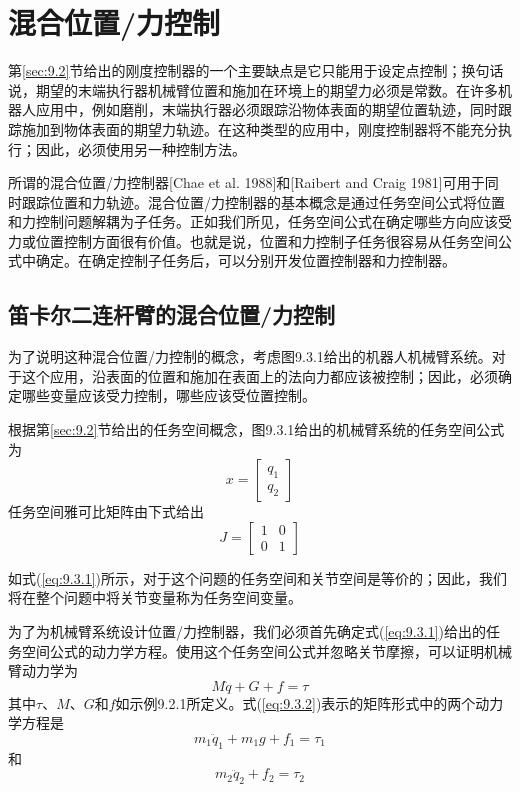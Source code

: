 \documentclass[12pt,a4paper]{ctexart}
\begin{document}
\section{混合位置/力控制}\label{sec:9.3}

第\ref{sec:9.2}节给出的刚度控制器的一个主要缺点是它只能用于设定点控制；换句话说，期望的末端执行器机械臂位置和施加在环境上的期望力必须是常数。在许多机器人应用中，例如磨削，末端执行器必须跟踪沿物体表面的期望位置轨迹，同时跟踪施加到物体表面的期望力轨迹。在这种类型的应用中，刚度控制器将不能充分执行；因此，必须使用另一种控制方法。

所谓的混合位置/力控制器[Chae et al. 1988]和[Raibert and Craig 1981]可用于同时跟踪位置和力轨迹。混合位置/力控制器的基本概念是通过任务空间公式将位置和力控制问题解耦为子任务。正如我们所见，任务空间公式在确定哪些方向应该受力或位置控制方面很有价值。也就是说，位置和力控制子任务很容易从任务空间公式中确定。在确定控制子任务后，可以分别开发位置控制器和力控制器。

\subsection{笛卡尔二连杆臂的混合位置/力控制}

为了说明这种混合位置/力控制的概念，考虑图9.3.1给出的机器人机械臂系统。对于这个应用，沿表面的位置和施加在表面上的法向力都应该被控制；因此，必须确定哪些变量应该受力控制，哪些应该受位置控制。

根据第\ref{sec:9.2}节给出的任务空间概念，图9.3.1给出的机械臂系统的任务空间公式为
\begin{equation}\label{eq:9.3.1}
x = \begin{bmatrix} q_1 \\ q_2 \end{bmatrix}
\end{equation}
任务空间雅可比矩阵由下式给出
\[
J = \begin{bmatrix} 1 & 0 \\ 0 & 1 \end{bmatrix}
\]

如式(\ref{eq:9.3.1})所示，对于这个问题的任务空间和关节空间是等价的；因此，我们将在整个问题中将关节变量称为任务空间变量。

为了为机械臂系统设计位置/力控制器，我们必须首先确定式(\ref{eq:9.3.1})给出的任务空间公式的动力学方程。使用这个任务空间公式并忽略关节摩擦，可以证明机械臂动力学为
\begin{equation}\label{eq:9.3.2}
M\ddot{q} + G + f = \tau
\end{equation}
其中$\tau$、$M$、$G$和$f$如示例9.2.1所定义。式(\ref{eq:9.3.2})表示的矩阵形式中的两个动力学方程是
\begin{equation}\label{eq:9.3.3}
m_1\ddot{q}_1 + m_1g + f_1 = \tau_1
\end{equation}
和
\begin{equation}\label{eq:9.3.4}
m_2\ddot{q}_2 + f_2 = \tau_2
\end{equation}
\end{document}
